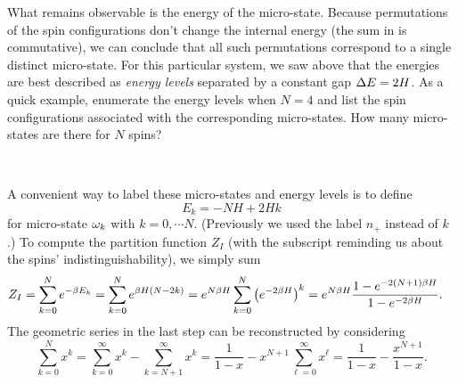 What remains observable is the energy of the micro-state.
Because permutations of the spin configurations don't change the internal energy (the sum in  is commutative), we can conclude that all such permutations correspond to a single distinct micro-state.
For this particular system, we saw above that the energies are best described as \textit{energy levels} separated by a constant gap $\Delta E = 2H$.
As a quick example, enumerate the energy levels when $N = 4$ and list the spin configurations associated with the corresponding micro-states.
How many micro-states are there for $N$ spins?
\begin{mdframed}
  \ \\[120 pt]
\end{mdframed}

A convenient way to label these micro-states and energy levels is to define
\begin{equation*}
  E_k = -NH + 2Hk
\end{equation*}
for micro-state $\omega_k$ with $k = 0, \cdots N$.
(Previously we used the label $n_+$ instead of $k$.)
To compute the partition function $Z_I$ (with the subscript reminding us about the spins' indistinguishability), we simply sum
\begin{align}
  Z_I & = \sum_{k = 0}^N e^{-\beta E_k} = \sum_{k = 0}^N e^{\beta H (N - 2k)} = e^{N\beta H} \sum_{k = 0}^N \left(e^{-2\beta H}\right)^k = e^{N\beta H} \frac{1 - e^{-2(N + 1) \beta H}}{1 - e^{-2\beta H}}.
\end{align}
The geometric series in the last step can be reconstructed by considering
\begin{equation*}
  \sum_{k = 0}^N x^k = \sum_{k = 0}^{\infty} x^k - \sum_{k = N + 1}^{\infty} x^k = \frac{1}{1 - x} - x^{N + 1} \sum_{\ell = 0}^{\infty} x^{\ell} = \frac{1}{1 - x} - \frac{x^{N + 1}}{1 - x}.
\end{equation*}

